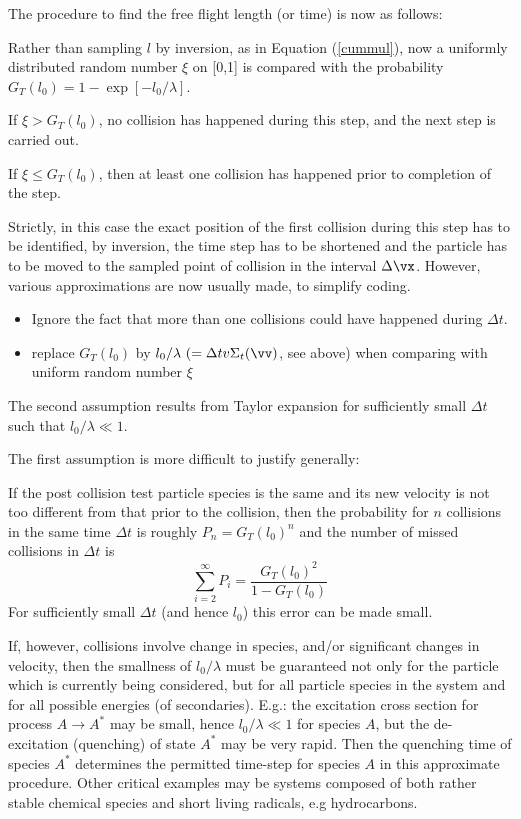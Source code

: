 The procedure to find the free flight length (or time) is now as follows:

Rather than sampling $l$ by inversion, as in Equation (\ref{cummul}),
now a uniformly distributed random number $\xi$ on [0,1] is compared with the probability $G_T(l_0) = 1-\exp[-l_0/\lambda]$.

If $\xi > G_T(l_0)$, no collision has happened during this step, and the next step is carried out.

If $\xi \le G_T(l_0)$, then at least one collision has happened prior to completion of the step.

Strictly, in this case the exact position of the first collision during this step has to be identified,
by inversion, the time step has to be shortened and the particle has to be moved to the sampled point of collision in the
interval $\Delta \vx$. However, various approximations are now usually made, to simplify coding.
\begin{itemize}
\item{} Ignore the fact that more than one collisions could have happened during $\Delta t$.
\item{} replace $G_T(l_0)$ by $l_0/\lambda ~ (= \Delta t v \Sigma_t(\vv)$, see above) when comparing with uniform random number $\xi$
\end{itemize}
The second assumption results from Taylor expansion for sufficiently small $\Delta t$ such that $l_0/\lambda \ll 1$.

The first assumption is more difficult to justify generally:

If the post collision test particle species is the same  and its new velocity is not too different from that prior to the collision,
then the probability for $n$ collisions in the same time $\Delta t$ is roughly $P_n=G_T(l_0)^n$
and the number of missed collisions in $\Delta t$ is
\begin{equation}
\sum_{i=2}^\infty P_i = \frac{G_T(l_0)^2}{1-G_T(l_0)}
\end{equation}
For sufficiently small $\Delta t$ (and hence $l_0$) this error can be made small.

If, however, collisions involve change in species, and/or significant changes in velocity, then
the smallness of $l_0/\lambda$ must be guaranteed not only for the particle which is currently being considered,
but for all particle species in the system and for all possible energies (of secondaries).
E.g.: the excitation cross section for process $A  \rightarrow A^*$ may be small, hence $l_0/\lambda \ll 1$ for species
$A$, but the de-excitation (quenching) of state $A^*$ may be very rapid. Then the quenching time of species $A^*$
determines the permitted time-step for species $A$ in this approximate procedure. Other critical examples may be systems
composed of both rather stable chemical species and short living radicals, e.g hydrocarbons.

